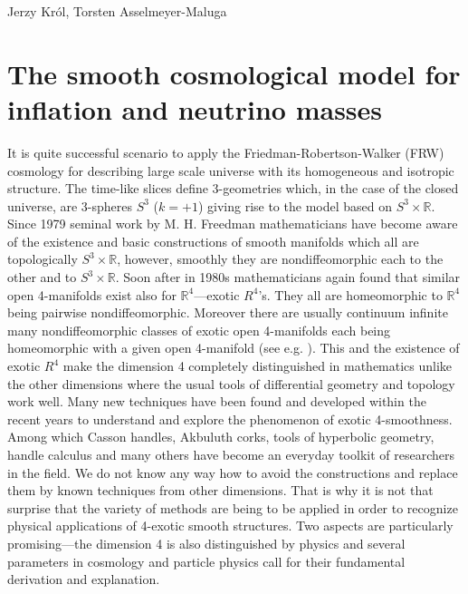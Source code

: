 \begin{artengenv2auth}{Jerzy Kr\'ol, Torsten Asselmeyer-Maluga}
\section{The smooth cosmological model for inflation and neutrino masses}\label{sec:2}
It is quite successful scenario to apply the Friedman-Robertson-Walker (FRW) cosmology for describing large scale universe with its homogeneous and isotropic structure. The time-like slices define 3-geometries which, in the case of the closed universe, are 3-spheres $S^3$ ($k=+1$) giving rise to the model based on $S^3\times \mathbb{R}$. Since 1979 seminal work by M. H. Freedman \parencite*{Freedman1979} mathematicians have become aware of the existence and basic constructions of smooth manifolds which all are topologically $S^3\times \mathbb{R}$, however, smoothly they are nondiffeomorphic each to the other and to $S^3\times \mathbb{R}$. Soon after in 1980s mathematicians again found that similar open 4-manifolds exist also for $\mathbb{R}^4$---exotic $R^4$'s. They all are homeomorphic to $\mathbb{R}^4$ being pairwise nondiffeomorphic. Moreover there are usually continuum infinite many nondiffeomorphic classes of exotic open 4-manifolds each being homeomorphic with a given open 4-manifold (see e.g. \cite{GS1999}). This and the existence of exotic $R^4$ make the dimension 4 completely distinguished in mathematics unlike the other dimensions where the usual tools of differential geometry and topology work well. Many new techniques have been found and developed within the recent years to understand and explore the phenomenon of exotic 4-smoothness. Among which Casson handles, Akbuluth corks, tools of hyperbolic geometry, handle calculus and many others have become an everyday toolkit of researchers in the field. We do not know any way how to avoid the constructions and replace them by known techniques from other dimensions. That is why it is not that surprise that the variety of methods are being to be applied in order to recognize physical applications of 4-exotic smooth structures. Two aspects are particularly promising---the dimension 4 is also distinguished by physics and several parameters in cosmology and particle physics call for their fundamental derivation and explanation. 


\end{artengenv2auth}
